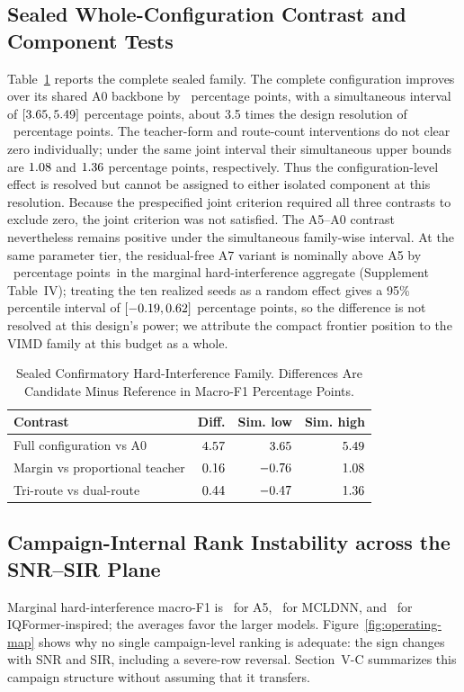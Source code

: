 \documentclass[letterpaper,journal]{IEEEtran}
\newcommand{\pp}{percentage points}
\begin{document}
\subsection{Sealed Whole-Configuration Contrast and Component Tests}
Table~\ref{tab:confirmatory} reports the complete sealed family. The complete
configuration improves over its shared A0 backbone by \MethodEffectDiff\ \pp,
with a simultaneous interval of
$[3.65,5.49]$ \pp, about 3.5 times
the design resolution of \DesignResolution\ \pp. The teacher-form and
route-count interventions do not clear zero individually; under the same joint
interval their simultaneous upper bounds are $1.08$ and
$1.36$ \pp, respectively.
Thus the configuration-level effect is resolved but cannot be assigned to
either isolated component at this resolution. Because the prespecified joint
criterion required all three contrasts to exclude zero, the joint criterion
was not satisfied. The A5--A0 contrast nevertheless remains positive under the
simultaneous family-wise interval. At the same
parameter tier, the residual-free A7 variant is nominally above A5 by
\ASevenVsAFiveHardDiff\ \pp\ in the marginal hard-interference aggregate
(Supplement Table~IV); treating the ten realized seeds as a random effect
gives a 95\% percentile interval of
$[-0.19,0.62]$ \pp, so the difference is not
resolved at this design's power; we attribute the compact frontier
position to the VIMD family at this budget as a whole.

\begin{table}[t]
\centering
\caption{Sealed Confirmatory Hard-Interference Family. Differences Are
Candidate Minus Reference in Macro-F1 Percentage Points.}
\label{tab:confirmatory}
\footnotesize
\setlength{\tabcolsep}{3.2pt}
\begin{tabular}{lrrr}
\toprule
Contrast & Diff. & Sim. low & Sim. high\\
\midrule
Full configuration vs A0 & $4.57$ & $3.65$ & $5.49$\\
Margin vs proportional teacher & $0.16$ & $-0.76$ & $1.08$\\
Tri-route vs dual-route & $0.44$ & $-0.47$ & $1.36$\\
\bottomrule
\end{tabular}
\end{table}

\subsection{Campaign-Internal Rank Instability across the SNR--SIR Plane}
Marginal hard-interference macro-F1 is \AbsAFiveHard\ for A5,
\AbsMCLDNNHard\ for MCLDNN, and \AbsIQFormerHard\ for IQFormer-inspired;
the averages favor the larger models. Figure~\ref{fig:operating-map} shows why no
single campaign-level ranking is adequate: the sign changes with SNR and SIR,
including a severe-row reversal. Section~V-C summarizes this campaign
structure without assuming that it transfers.
\end{document}
